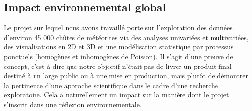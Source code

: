 \documentclass[12pt]{article}
\begin{document}
\subsection{Impact environnemental global}
Le projet sur lequel nous avons travaillé porte sur l’exploration des données d'environ 45 000 chûtes de météorites via des analyses univariées et multivariées, des visualisations en 2D et 3D et une modélisation statistique par processus ponctuels (homogènes et inhomogènes de Poisson). Il s’agit d’une preuve de concept, c’est-à-dire que notre objectif n’était pas de livrer un produit final destiné à un large public ou à une mise en production, mais plutôt de démontrer la pertinence d’une approche scientifique dans le cadre d’une recherche exploratoire. Cela a naturellement un impact sur la manière dont le projet s’inscrit dans une réflexion environnementale.
\end{document}
